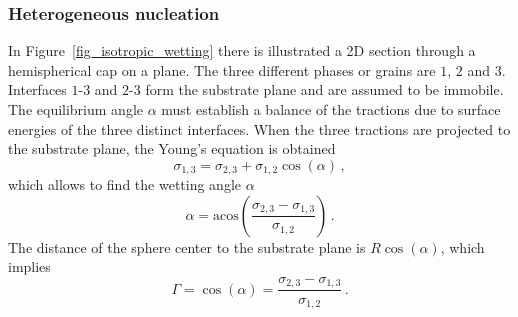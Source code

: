         \subsubsection{Heterogeneous nucleation}
        In Figure~\ref{fig_isotropic_wetting} there is illustrated a 2D section through a hemispherical cap on a plane. The three different phases or grains are $\mathit{1}$, $\mathit{2}$ and $\mathit{3}$. Interfaces $\mathit{1}$-$\mathit{3}$ and $\mathit{2}$-$\mathit{3}$ form the substrate plane and are assumed to be immobile. The equilibrium angle $\alpha$ must establish a balance of the tractions due to surface energies of the three distinct interfaces. When the three tractions are projected to the substrate plane, the Young's equation is obtained
        \begin{equation}
            \sigma_{1,3} = \sigma_{2,3} + \sigma_{1,2}\cos(\alpha) \,,
        \end{equation}
        which allows to find the wetting angle $\alpha$ 
        \begin{equation}
            \alpha = \mathrm{acos}\left(\frac{\sigma_{2,3}-\sigma_{1,3}}{\sigma_{1,2}}\right) \,.
        \end{equation}
        The distance of the sphere center to the substrate plane is $R\cos(\alpha)$, which implies
        \begin{equation}
            \Gamma = \cos(\alpha) = \frac{\sigma_{2,3}-\sigma_{1,3}}{\sigma_{1,2}} \,.
        \end{equation}
        
%            
        

